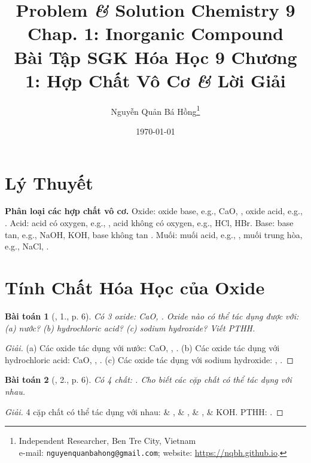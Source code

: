\documentclass{article}
\title{Problem {\it\&} Solution Chemistry 9 Chap. 1: Inorganic Compound\\Bài Tập SGK Hóa Học 9 Chương 1: Hợp Chất Vô Cơ {\it\&} Lời Giải}
\author{Nguyễn Quản Bá Hồng\footnote{Independent Researcher, Ben Tre City, Vietnam\\e-mail: \texttt{nguyenquanbahong@gmail.com}; website: \url{https://nqbh.github.io}.}}
\date{\today}
\newtheorem{baitoan}{Bài toán}
\begin{document}
\maketitle
\tableofcontents


\section*{Lý Thuyết}
\textbf{\textsf{Phân loại các hợp chất vô cơ.}} Oxide: oxide base, e.g., CaO, , oxide acid, e.g., . Acid: acid có oxygen, e.g., , acid không có oxygen, e.g., HCl, HBr. Base: base tan, e.g., NaOH, KOH, base không tan . Muối: muối acid, e.g., , muối trung hòa, e.g., NaCl, .


\section{Tính Chất Hóa Học của Oxide}

\begin{baitoan}[\cite{SGK_Hoa_Hoc_9}, 1., p. 6]
	Có 3 oxide: {\rm CaO, }. Oxide nào có thể tác dụng được với: (a) nước? (b) hydrochloric acid? (c) sodium hydroxide? Viết {\rm PTHH}.
\end{baitoan}

\begin{proof}[Giải]
	(a) Các oxide tác dụng với nước: CaO, , . (b) Các oxide tác dụng với hydrochloric acid: CaO, , . (c) Các oxide tác dụng với sodium hydroxide: , .
\end{proof}

\begin{baitoan}[\cite{SGK_Hoa_Hoc_9}, 2., p. 6]
	Có 4 chất: {\rm{}}. Cho biết các cặp chất có thể tác dụng với nhau.
\end{baitoan}

\begin{proof}[Giải]
	4 cặp chất có thể tác dụng với nhau:  \& ,  \& ,  \& ,  \& KOH. PTHH: .
\end{proof}
\end{document}
